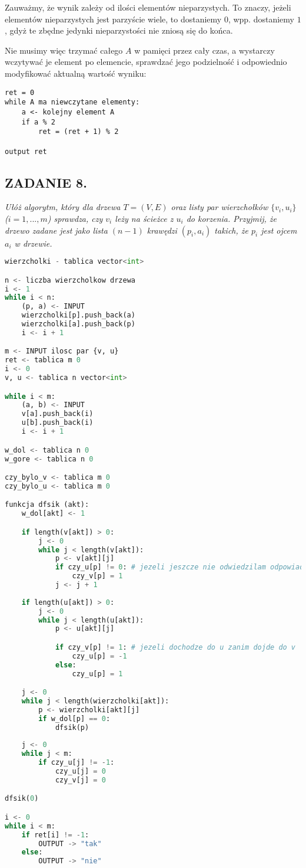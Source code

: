 \documentclass{article}
\begin{document}
Zauważmy, że wynik zależy od ilości elementów nieparzystych. To znaczy, jeżeli elementów nieparzystych jest parzyście wiele, to dostaniemy $0$, wpp. dostaniemy $1$, gdyż te zbędne jedynki nieparzystości nie zniosą się do końca.

Nie musimy więc trzymać całego $A$ w pamięci przez cały czas, a wystarczy wczytywać je element po elemencie, sprawdzać jego podzielność i odpowiednio modyfikować aktualną wartość wyniku:
\begin{lstlisting}
ret = 0
while A ma niewczytane elementy:
    a <- kolejny element A
    if a % 2
        ret = (ret + 1) % 2
    
output ret
\end{lstlisting}

\subsection*{ZADANIE 8.}
\emph{Ułóż algorytm, który dla drzewa $T=(V, E)$ oraz listy par wierzchołków $\{v_i,u_i\}$ ($i=1,...,m$) sprawdza, czy $v_i$ leży na ścieżce z $u_i$ do korzenia. Przyjmij, że drzewo zadane jest jako lista $(n-1)$ krawędzi $(p_i,a_i)$ takich, że $p_i$ jest ojcem $a_i$ w drzewie.}

\begin{lstlisting}[language=python]
wierzcholki - tablica vector<int>

n <- liczba wierzcholkow drzewa
i <- 1
while i < n:
    (p, a) <- INPUT
    wierzcholki[p].push_back(a)
    wierzcholki[a].push_back(p)
    i <- i + 1

m <- INPUT ilosc par {v, u}
ret <- tablica m 0
i <- 0
v, u <- tablica n vector<int>

while i < m:
    (a, b) <- INPUT
    v[a].push_back(i)
    u[b].push_back(i)
    i <- i + 1

w_dol <- tablica n 0
w_gore <- tablica n 0

czy_bylo_v <- tablica m 0
czy_bylo_u <- tablica m 0

funkcja dfsik (akt):
    w_dol[akt] <- 1

    if length(v[akt]) > 0:
        j <- 0
        while j < length(v[akt]):
            p <- v[akt][j]
            if czy_u[p] != 0: # jezeli jeszcze nie odwiedzilam odpowiadajacego u
                czy_v[p] = 1
            j <- j + 1
    
    if length(u[akt]) > 0:
        j <- 0
        while j < length(u[akt]):
            p <- u[akt][j]

            if czy_v[p] != 1: # jezeli dochodze do u zanim dojde do v
                czy_u[p] = -1
            else:
                czy_u[p] = 1

    j <- 0
    while j < length(wierzcholki[akt]):
        p <- wierzcholki[akt][j]
        if w_dol[p] == 0:
            dfsik(p)
        
    j <- 0
    while j < m:
        if czy_u[j] != -1:
            czy_u[j] = 0
            czy_v[j] = 0 

dfsik(0)

i <- 0
while i < m:
    if ret[i] != -1:
        OUTPUT -> "tak"
    else:
        OUTPUT -> "nie"

\end{lstlisting}
\end{document}
